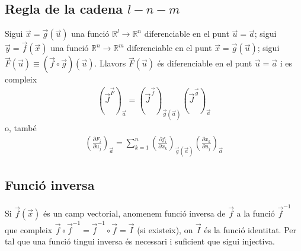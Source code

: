 \subsection{Regla de la cadena $l-n-m$}
Sigui $\vec{x} = \vec{g}(\vec{u})$ una funció $\mathbb{R}^{l} \to \mathbb{R}^{n}$ diferenciable en el punt $\vec{u} = \vec{a}$; sigui $\vec{y}=\vec{f}(\vec{x})$ una funció $\mathbb{R}^{n} \to \mathbb{R}^{m}$ diferenciable en el punt $\vec{x} = \vec{g}(\vec{u})$; sigui $\vec{F}(\vec{u}) \equiv (\vec{f} \circ \vec{g})(\vec{u})$. Llavors $\vec{F}(\vec{u})$ és diferenciable en el punt $\vec{u} = \vec{a}$ i es compleix
\begin{align}
    (\vec{J}^{\vec{F}})_{\vec{a}} = (\vec{J}^{\vec{f}})_{\vec{g}(\vec{a})} (\vec{J}^{\vec{g}})_{\vec{a}}
\end{align}
o, també
\begin{align}
    \left( \frac{\partial F_{i}}{\partial u_{j}} \right)_{\vec{a}} = \sum_{k=1}^{n}  \left( \frac{\partial f_{i}}{\partial x_{k}} \right)_{\vec{g}(\vec{a})}  \left( \frac{\partial x_{k}}{\partial u_{j}} \right)_{\vec{a}}
\end{align}

\subsection{Funció inversa}
\begin{defi}
    Si $\vec{f}(\vec{x})$ és un camp vectorial, anomenem funció inversa de $\vec{f}$ a la funció $\vec{f}^{-1}$ que compleix $\vec{f} \circ \vec{f}^{-1} = \vec{f}^{-1} \circ \vec{f} = \vec{I}$ (si existeix), on $\vec{I}$ és la funció identitat. Per tal que una funció tingui inversa és necessari i suficient que sigui injectiva.
\end{defi}

